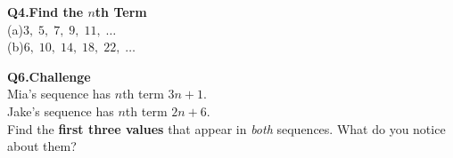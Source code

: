 \documentclass{beamer}
\newcommand{\ashow}[1]{\uncover<2->{\textcolor{red}{\small #1}}}
\begin{document}
\begin{frame}
\begin{minipage}[t]{0.48\textwidth}
\vspace{0.45cm}

    \small\textbf{Q4.\enspace Find the $n$th Term}\\
    \footnotesize
    (a)\;$3,\;5,\;7,\;9,\;11,\;\ldots$\quad
    \ashow{$2n+1$}\\[0.3em]
    (b)\;$6,\;10,\;14,\;18,\;22,\;\ldots$\quad
    \ashow{$4n+2$}

    \vspace{0.45cm}

        \small\textbf{Q6.\;Challenge}\\
    \footnotesize
    Mia's sequence has $n$th term $3n+1$.\\
    Jake's sequence has $n$th term $2n+6$.\\
    Find the \textbf{first three values} that appear
    in \emph{both} sequences.
    What do you notice about them?\\[0.2em]
    \ashow{Shared values:\;$10,\;16,\;22,\;\ldots$
           \;(they increase by 6 each time).}
    
  \end{minipage}

\end{frame}
\end{document}
